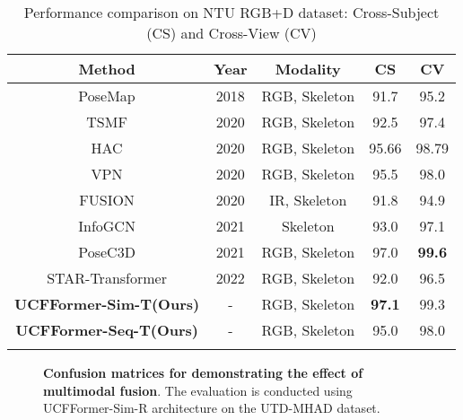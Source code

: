 \begin{table}
\begin{center}
\caption{Performance comparison on NTU RGB+D dataset: Cross-Subject (CS) and Cross-View (CV)}
\label{tab2:NTU_RGB+D}
\begin{adjustbox}{width=0.45\textwidth}
\begin{tabular}{c | c | c | c | c}
\Xhline{2.5\arrayrulewidth}
Method & Year & Modality & CS & CV \\ \hline \hline
PoseMap \cite{liu2018recognizing} & 2018 & RGB, Skeleton & 91.7 & 95.2 \\
TSMF \cite{bruce2021multimodal}  & 2020 & RGB, Skeleton & 92.5 & 97.4 \\
HAC \cite{davoodikakhki2020hierarchical} & 2020 & RGB, Skeleton & 95.66 & 98.79 \\
VPN \cite{das2020vpn} & 2020 & RGB, Skeleton & 95.5 & 98.0 \\
FUSION  \cite{de2020infrared} & 2020 & IR, Skeleton & 91.8 & 94.9 \\
InfoGCN \cite{chi2022infogcn}  & 2021 & Skeleton & 93.0 & 97.1 \\
PoseC3D \cite{duan2022revisiting} & 2021 & RGB, Skeleton & 97.0 & \textbf{99.6} \\
STAR-Transformer \cite{ahn2023star} & 2022 & RGB, Skeleton & 92.0 & 96.5 \\
\hline
\textbf{UCFFormer-Sim-T(Ours)} & - & RGB, Skeleton & \textbf{97.1} &  99.3 \\
\textbf{UCFFormer-Seq-T(Ours)} & - & RGB, Skeleton & 95.0 & 98.0 \\

\Xhline{2.5\arrayrulewidth}
\end{tabular}   
\end{adjustbox}
\end{center}
\end{table}

\begin{figure*}[tbh]
    \centering
    \captionsetup[subfloat]{labelfont=tiny,textfont=tiny}
    \quad
    \quad
    \quad
    \quad
    \quad
    \caption{\textbf{Confusion matrices for demonstrating the effect of multimodal fusion}. The evaluation is conducted using UCFFormer-Sim-R architecture on the UTD-MHAD dataset. 
    }
    \label{fig4:confusion_matrix}
\end{figure*}

